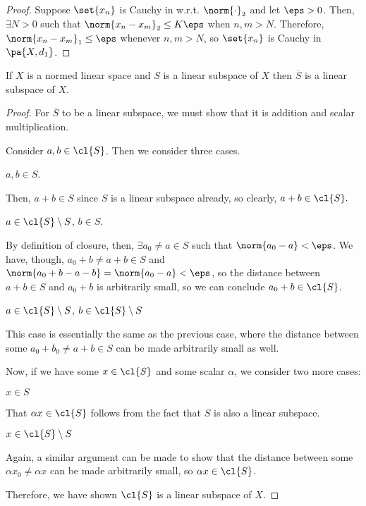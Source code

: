 \documentclass[10pt,letterpaper,twoside]{hmcpset}
\begin{document}
\begin{solution}
 \begin{proof}
  Suppose $\set{x_n}$ is Cauchy in w.r.t. $\norm{\cdot}_2$ and let $\eps > 0$.  Then, $\exists N > 0$ such that $\norm{x_n - x_m}_2 \leq K\eps$ when $n,m > N$.  Therefore, $\norm{x_n - x_m}_1 \leq \eps$ whenever $n,m > N$, so $\set{x_n}$ is Cauchy in $\pa{X,d_1}$.
 \end{proof}

\end{solution}


\begin{problem}[3]
 If $X$ is a normed linear space and $S$ is a linear subspace of $X$ then $\overline{S}$ is a linear subspace of $X$.
\end{problem}

\begin{solution}
 \begin{proof}
 For $\overline{S}$ to be a linear subspace, we must show that it is addition and scalar multiplication.
 
 Consider $a,b \in \cl{S}$.  Then we consider three cases.
 \begin{case}
  $a,b \in S$.
 \end{case}
  Then, $a + b \in S$ since $S$ is a linear subspace already, so clearly, $a + b \in \cl{S}.$
  \begin{case}
   $a \in \cl{S} \setminus S$, $b \in S$.
  \end{case}
  By definition of closure, then, $\exists a_0 \neq a \in S$ such that $\norm{a_0 - a} < \eps$.  We have, though, $a_0 + b \neq a + b \in S$ and $\norm{a_0 + b - a - b} = \norm{a_0 - a} < \eps$, so the distance between $a + b \in S$ and $a_0 + b$ is arbitrarily small, so we can conclude $a_0 + b \in \cl{S}$.
  \begin{case}
   $a \in \cl{S} \setminus S$, $b \in \cl{S} \setminus S$
  \end{case}
   This case is essentially the same as the previous case, where the distance between some $a_0 + b_0 \neq a + b \in S$ can be made arbitrarily small as well.
   
   Now, if we have some $x \in \cl{S}$ and some scalar $\alpha$, we consider two more cases:
   
   \begin{case}
    $x \in S$
   \end{case}
   That $\alpha x \in \cl{S}$ follows from the fact that $S$ is also a linear subspace.
   \begin{case}
    $x \in \cl{S} \setminus S$
   \end{case}
    Again, a similar argument can be made to show that the distance between some $\alpha x_0 \neq \alpha x$ can be made arbitrarily small, so $\alpha x \in \cl{S}$.
    
    Therefore, we have shown $\cl{S}$ is a linear subspace of $X$.
 \end{proof}
\end{solution}
\end{document}
